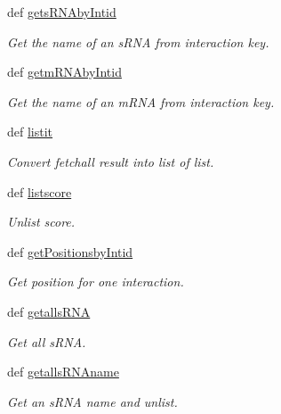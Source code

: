 \begin{DoxyCompactItemize}
def \hyperlink{classirna_1_1David2tulip_1_1Sqlite__manager_1_1Sqlite__manager_a11496489cf2d3dc6ec71429dc0533934}{gets\-R\-N\-Aby\-Intid}
\begin{DoxyCompactList}\small\item\em \-Get the name of an s\-R\-N\-A from interaction key. \end{DoxyCompactList}\item 
def \hyperlink{classirna_1_1David2tulip_1_1Sqlite__manager_1_1Sqlite__manager_a1102d9245a29406b427be311ac55bce3}{getm\-R\-N\-Aby\-Intid}
\begin{DoxyCompactList}\small\item\em \-Get the name of an m\-R\-N\-A from interaction key. \end{DoxyCompactList}\item 
def \hyperlink{classirna_1_1David2tulip_1_1Sqlite__manager_1_1Sqlite__manager_a868dab3136c8897748326db2c7b29c06}{listit}
\begin{DoxyCompactList}\small\item\em \-Convert fetchall result into list of list. \end{DoxyCompactList}\item 
def \hyperlink{classirna_1_1David2tulip_1_1Sqlite__manager_1_1Sqlite__manager_a08eef0f030ae2dc620503f0e427c5727}{listscore}
\begin{DoxyCompactList}\small\item\em \-Unlist score. \end{DoxyCompactList}\item 
def \hyperlink{classirna_1_1David2tulip_1_1Sqlite__manager_1_1Sqlite__manager_ad30e0fd47dc8fa4d248b5e1fa72691bc}{get\-Positionsby\-Intid}
\begin{DoxyCompactList}\small\item\em \-Get position for one interaction. \end{DoxyCompactList}\item 
def \hyperlink{classirna_1_1David2tulip_1_1Sqlite__manager_1_1Sqlite__manager_aa02edfedb707b767c7e1ecff7fc82bce}{getalls\-R\-N\-A}
\begin{DoxyCompactList}\small\item\em \-Get all s\-R\-N\-A. \end{DoxyCompactList}\item 
def \hyperlink{classirna_1_1David2tulip_1_1Sqlite__manager_1_1Sqlite__manager_ab27b7e33bceac54deb9632df558d6779}{getalls\-R\-N\-Aname}
\begin{DoxyCompactList}\small\item\em \-Get an s\-R\-N\-A name and unlist. \end{DoxyCompactList}\item 

\end{DoxyCompactItemize}

